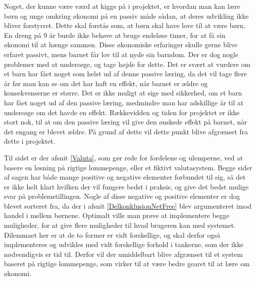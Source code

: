 Noget, der kunne være værd at kigge på i projektet, er hvordan man kan lære børn og unge omkring økonomi på en passiv måde sådan, at deres udvikling ikke bliver forstyrret. Dette skal forstås som, at børn skal have love til at være børn. En dreng på 9 år burde ikke behøve at bruge endeløse timer, for at få sin økonomi til at hænge sammen. Disse økonomiske erfaringer skulle gerne blive erfaret passivt, mens barnet får lov til at nyde sin barndom. Der er dog nogle problemer med at undersøge, og tage højde for dette. Det er svært at vurdere om et barn har fået noget som helst ud af denne passive læring, da det vil tage flere år før man kan se om det har haft en effekt, når barnet er ældre og konsekvenserne er større. Det er ikke muligt at sige med sikkerhed, om et barn har fået noget ud af den passive læring, medmindre man har adskillige år til at undersøge om det havde en effekt. Rækkevidden og tiden for projektet er ikke stort nok, til at om den passive læring vil give den ønskede effekt på barnet, når det engang er blevet ældre. På grund af dette vil dette punkt blive afgrænset fra dette i projektet.

Til sidst er der afsnit \ref{Valuta}, som gør rede for fordelene og ulemperne, ved at basere en løsning på rigtige lommepenge, eller et fiktivt valutasystem. Begge sider af sagen har både mange positive og negative elementer forbundet til sig, så det er ikke helt klart hvilken der vil fungere bedst i praksis, og give det bedst mulige svar på problemstillingen. Nogle af disse negative og positive elementer er dog blevet sorteret fra, da der i afsnit \ref{DelkonklusionNetFree} blev argumenteret imod handel i mellem børnene. Optimalt ville man prøve at implementere begge muligheder, for at give flere muligheder til hvad brugeren kan med systemet. Dilemmaet her er at de to former er vidt forskellige, og skal derfor også implementeres og udvikles med vidt forskellige forhold i tankerne, som der ikke nødvendigvis er tid til. Derfor vil der umiddelbart blive afgrænset til et system baseret på rigtige lommepenge, som virker til at være bedre gearet til at lære om økonomi.
